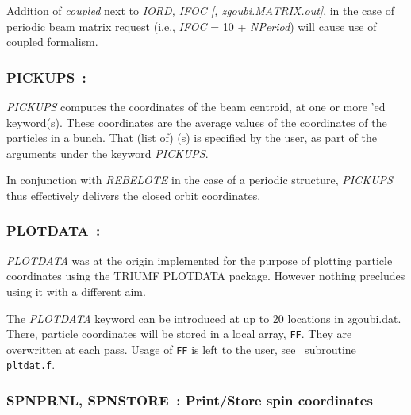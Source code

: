 \medskip

\noindent  Addition of \textsl{coupled} next to \textsl{IORD, IFOC [, zgoubi.MATRIX.out]}, in the case of 
periodic beam matrix request (i.e., \textsl{IFOC} = 10  +  \textsl{NPeriod}) will cause use of coupled formalism. 




\newpage

 
\subsubsection*{PICKUPS~: \PICKUPSTitl}\label{PICKUPS} 
\medskip

\noindent \textsl{PICKUPS} computes the coordinates of the beam centroid, 
at one or more \LABEL'ed keyword(s). 
 These coordinates are the average values of the coordinates of the  particles in a bunch. 
That (list of) \LABEL(s) is specified by the user, as part of the arguments under the keyword  \textsl{PICKUPS}.

\medskip
\noindent In conjunction with \textsl{REBELOTE} in the case of a periodic structure, 
  \textsl{PICKUPS} thus effectively delivers the closed orbit coordinates.        

\medskip






\newpage


\subsubsection*{PLOTDATA~: \PLOTDATATitl~\protect\cite{BiblioPlot}}%
\label{PLOTDATA} 

\medskip

\noindent  \textsl{PLOTDATA} was at the origin implemented for the purpose of plotting particle 
coordinates using the TRIUMF PLOTDATA package. However nothing precludes using it 
with a different aim. 

\medskip

\noindent  The \textsl{PLOTDATA} keyword can be introduced at up to 20 locations in zgoubi.dat.  There, particle coordinates 
will be stored in a local array, \texttt{FF}. They are overwritten at each pass. Usage of \texttt{FF} is left to the user, 
see \FORTRAN\ subroutine \texttt{pltdat.f}. 


\newpage

\subsubsection*{SPNPRNL, SPNSTORE~: Print/Store spin coordinates 
  }\label{SPNPRNL} \label{SPNSTORE}


